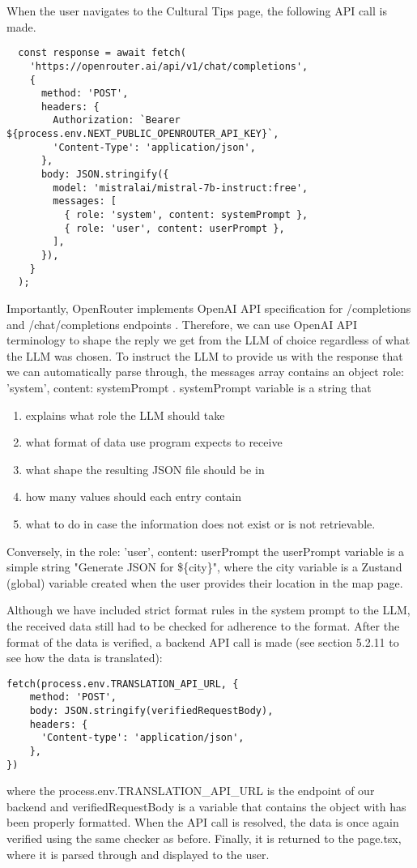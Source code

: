When the user navigates to the Cultural Tips page, the following API call is made. 
\begin{verbatim} 
  const response = await fetch(
    'https://openrouter.ai/api/v1/chat/completions',
    {
      method: 'POST',
      headers: {
        Authorization: `Bearer ${process.env.NEXT_PUBLIC_OPENROUTER_API_KEY}`,
        'Content-Type': 'application/json',
      },
      body: JSON.stringify({
        model: 'mistralai/mistral-7b-instruct:free',
        messages: [
          { role: 'system', content: systemPrompt },
          { role: 'user', content: userPrompt },
        ],
      }),
    }
  );
\end{verbatim}
Importantly, OpenRouter implements OpenAI API specification for /completions and /chat/completions endpoints \cite{noauthor_openrouter_nodate}. Therefore, we can use OpenAI API terminology \cite{openAI_explanation_onHowToUseTheirApi} to shape the reply we get from the LLM of choice regardless of what the LLM was chosen. To instruct the LLM to provide us with the response that we can automatically parse through, the messages array contains an object { role: 'system', content: systemPrompt }. systemPrompt variable is a string that 
\begin{enumerate} \itemsep0pt \parskip0pt
    \item explains what role the LLM should take
    \item what format of data use program expects to receive
    \item what shape the resulting JSON file should be in
    \item how many values should each entry contain
    \item what to do in case the information does not exist or is not retrievable.
\end{enumerate}
Conversely, in the { role: 'user', content: userPrompt } the userPrompt variable is a simple string "Generate JSON for \$\{city\}", where the city variable is a Zustand (global) variable created when the user provides their location in the map page. 

Although we have included strict format rules in the system prompt to the LLM, the received data still had to be checked for adherence to the format. After the format of the data is verified, a backend API call is made (see section 5.2.11 to see how the data is translated):
\begin{verbatim} 
fetch(process.env.TRANSLATION_API_URL, {
    method: 'POST',
    body: JSON.stringify(verifiedRequestBody),
    headers: {
      'Content-type': 'application/json',
    },
})
\end{verbatim}
where the process.env.TRANSLATION\_API\_URL is the endpoint of our backend and verifiedRequestBody is a variable that contains the object with has been properly formatted. When the API call is resolved, the data is once again verified using the same checker as before. Finally, it is returned to the page.tsx, where it is parsed through and displayed to the user. 


